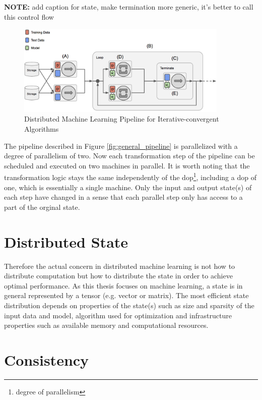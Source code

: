 \textbf{NOTE:} add caption for state, make termination more generic, it's better to call this control flow
\begin{figure}[ht]
\centering
\includegraphics[width=0.9\textwidth]{img/general_pipeline_dist.png}
\caption{Distributed Machine Learning Pipeline for Iterative-convergent Algorithms}
\label{fig:general_pipeline_dist}
\end{figure}
The pipeline described in Figure \ref{fig:general_pipeline} is parallelized with a degree of parallelism of two.
Now each transformation step of the pipeline can be scheduled and executed on two machines in parallel.
It is worth noting that the transformation logic stays the same independently of the dop\footnote{degree of parallelism}, including a dop of one, which is essentially a single machine.
Only the input and output state(s) of each step have changed in a sense that each parallel step only has access to a part of the orginal state.

\section{Distributed State}
Therefore the actual concern in distributed machine learning is not how to distribute computation but how to distribute the state in order to achieve optimal performance.
As this thesis focuses on machine learning, a state is in general represented by a tensor (e.g. vector or matrix).
The most efficient state distribution depends on properties of the state(s) such as size and sparsity of the input data and model, algorithm used for optimization and infrastructure properties such as available memory and computational resources.


\section{Consistency}

